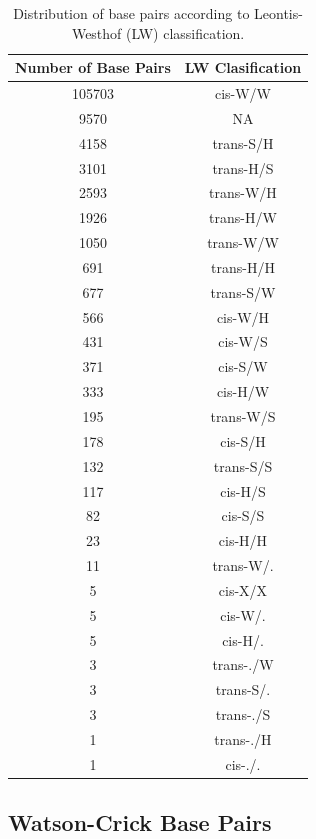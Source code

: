 \begin{center}
\begin{longtable}{c|c}
\caption{Distribution of base pairs according to Leontis-Westhof (LW) classification.}\\ \hline
\bf{Number of Base Pairs} & \bf{LW Clasification} \\ \hline \hline
 105703 & cis-W/W     \\ \hline
   9570 & NA          \\ \hline
   4158 & trans-S/H   \\ \hline
   3101 & trans-H/S   \\ \hline
   2593 & trans-W/H   \\ \hline
   1926 & trans-H/W   \\ \hline
   1050 & trans-W/W   \\ \hline
    691 & trans-H/H   \\ \hline
    677 & trans-S/W   \\ \hline
    566 & cis-W/H     \\ \hline
    431 & cis-W/S     \\ \hline
    371 & cis-S/W     \\ \hline
    333 & cis-H/W     \\ \hline
    195 & trans-W/S   \\ \hline
    178 & cis-S/H     \\ \hline
    132 & trans-S/S   \\ \hline
    117 & cis-H/S     \\ \hline
     82 & cis-S/S     \\ \hline
     23 & cis-H/H     \\ \hline
     11 & trans-W/.   \\ \hline
      5 & cis-X/X     \\ \hline
      5 & cis-W/.     \\ \hline
      5 & cis-H/.     \\ \hline
      3 & trans-./W   \\ \hline
      3 & trans-S/.   \\ \hline
      3 & trans-./S   \\ \hline
      1 & trans-./H   \\ \hline
      1 & cis-./.     \\ \hline
\end{longtable}
\end{center}


\subsection{Watson-Crick Base Pairs}

